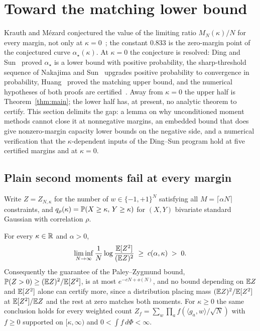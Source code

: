 
\section{Toward the matching lower bound}\label{sec:lower}

Krauth and M\'ezard conjectured the value of the limiting ratio
$M_N(\kappa)/N$ for every margin, not only at
$\kappa=0$~\cite{krauth1989storage}; the constant $0.833$ is the
zero-margin point of the conjectured curve $\alpha_\star(\kappa)$.
At $\kappa=0$ the conjecture is resolved: Ding and
Sun~\cite{ding2019capacity} proved $\alpha_\star$ is a lower bound
with positive probability, the sharp-threshold sequence of Nakajima
and Sun~\cite{nakajimasun2022} upgrades positive probability to
convergence in probability, Huang~\cite{huang2024capacity} proved the
matching upper bound, and the numerical hypotheses of both proofs are
certified~\cite{shmalo2026capacity}.  Away from $\kappa=0$ the upper
half is Theorem~\ref{thm:main}; the lower half has, at present, no
analytic theorem to certify.  This section delimits the gap: a lemma
on why unconditioned moment methods cannot close it at nonnegative
margins, an embedded bound that does give nonzero-margin capacity
lower bounds on the negative side, and a numerical verification that
the $\kappa$-dependent inputs of the Ding--Sun program hold at
five certified margins and at $\kappa=0$.

\subsection{Plain second moments fail at every margin}

Write $Z=Z_{N,\kappa}$ for the number of $w\in\{-1,+1\}^N$ satisfying
all $M=\lceil\alpha N\rceil$ constraints, and
$q_\rho(\kappa)=\mathbb{P}(X\ge\kappa,\,Y\ge\kappa)$ for $(X,Y)$ bivariate
standard Gaussian with correlation $\rho$.

\begin{lemma}\label{lem:secondmoment}
For every $\kappa\in\mathbb{R}$ and $\alpha>0$,
\[
\liminf_{N\to\infty}\frac1N\log\frac{\mathbb{E}[Z^2]}{(\mathbb{E} Z)^2}
\;\ge\; c(\alpha,\kappa)\;>\;0 .
\]
Consequently the guarantee of the Paley--Zygmund bound,
$\mathbb{P}(Z>0)\ge(\mathbb{E} Z)^2/\mathbb{E}[Z^2]$, is at most $e^{-cN+o(N)}$, and no
bound depending on $\mathbb{E} Z$ and
$\mathbb{E}[Z^2]$ alone can certify more, since a distribution placing mass
$(\mathbb{E} Z)^2/\mathbb{E}[Z^2]$ at $\mathbb{E}[Z^2]/\mathbb{E} Z$ and the rest at zero matches
both moments.  For $\kappa\ge0$ the same conclusion holds for every
weighted count $Z_f=\sum_w\prod_a f(\langle g_a,w\rangle/\sqrt N)$
with $f\ge0$ supported on $[\kappa,\infty)$ and
$0<\int f\,d\Phi<\infty$.
\end{lemma}

